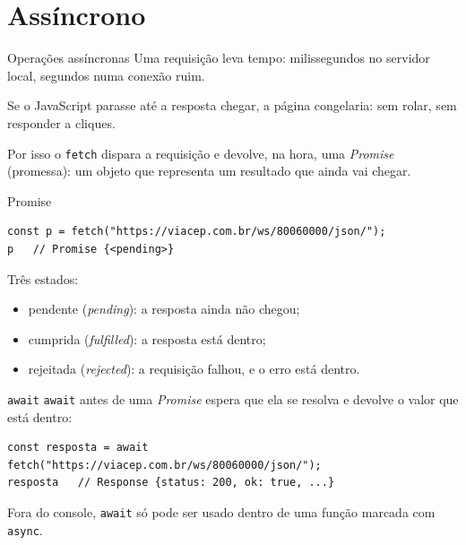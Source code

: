 \documentclass{beamer}
\begin{document}
\section{Assíncrono}

\begin{frame}{Operações assíncronas}
	Uma requisição leva tempo: milissegundos no servidor local, segundos numa
	conexão ruim.

	\vspace{0.3cm}
	Se o JavaScript parasse até a resposta chegar, a página congelaria: sem
	rolar, sem responder a cliques.

	\vspace{0.3cm}
	Por isso o \texttt{fetch} dispara a requisição e devolve, na hora, uma
	\emph{Promise} (promessa): um objeto que representa um resultado que ainda
	vai chegar.
\end{frame}

\begin{frame}[fragile]{Promise}
	\begin{verbatim}
const p = fetch("https://viacep.com.br/ws/80060000/json/");
p   // Promise {<pending>}
	\end{verbatim}

	\vspace{0.2cm}
	Três estados:
	\begin{itemize}
		\item pendente (\emph{pending}): a resposta ainda não chegou;
		\item cumprida (\emph{fulfilled}): a resposta está dentro;
		\item rejeitada (\emph{rejected}): a requisição falhou, e o erro está
		      dentro.
	\end{itemize}
\end{frame}

\begin{frame}[fragile]{\texttt{await}}
	\texttt{await} antes de uma \emph{Promise} espera que ela se resolva e
	devolve o valor que está dentro:

	\begin{verbatim}
const resposta = await fetch("https://viacep.com.br/ws/80060000/json/");
resposta   // Response {status: 200, ok: true, ...}
	\end{verbatim}

	\vspace{0.3cm}
	Fora do console, \texttt{await} só pode ser usado dentro de uma função
	marcada com \texttt{async}.
\end{frame}
\end{document}
